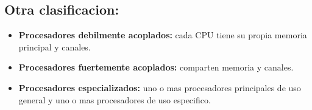 \documentclass[11pt]{article}
\begin{document}
\subsection{Otra clasificacion:}
\begin{itemize}
    \item \textbf{Procesadores debilmente acoplados:} cada CPU tiene su propia memoria principal y canales.
    \item \textbf{Procesadores fuertemente acoplados:} comparten memoria y canales.
    \item \textbf{Procesadores especializados:} uno o mas procesadores principales de uso general y uno o mas procesadores de uso especifico.
\end{itemize}
\end{document}
